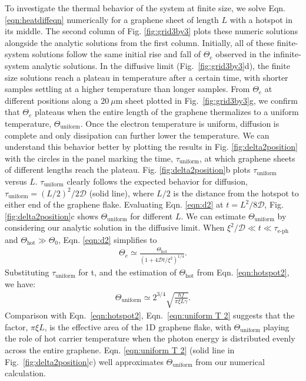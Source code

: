 \documentclass[aip, amsmath,amssymb, reprint]{revtex4-1}
\newcommand{\ba}{\begin{eqnarray}}
\newcommand{\ea}{\end{eqnarray}}
\begin{document}
To investigate the thermal behavior of the system at finite size, we solve Eqn. \ref{eqn:heatdiffeqn} numerically for a graphene sheet of length $L$ with a hotspot in its middle. The second column of Fig. \ref{fig:grid3by3} plots these numeric solutions alongside the analytic solutions from the first column. Initially, all of these finite-system solutions follow the same initial rise and fall of $\Theta_e$ observed in the infinite-system analytic solutions. In the diffusive limit (Fig.~\ref{fig:grid3by3}d), the finite size solutions reach a plateau in temperature after a certain time, with shorter samples settling at a higher temperature than longer samples. From $\Theta_e$ at different positions along a $20~\mu$m sheet plotted in Fig.~\ref{fig:grid3by3}g, we confirm that $\Theta_e$ plateaus when the entire length of the graphene thermalizes to a uniform temperature, $\Theta_{\text{uniform}}$. Once the electron temperature is uniform, diffusion is complete and only dissipation can further lower the temperature. We can understand this behavior better by plotting the results in Fig. \ref{fig:delta2position} with the circles in the panel marking the time, $\tau_{\text{uniform}}$, at which graphene sheets of different lengths reach the plateau. Fig. \ref{fig:delta2position}b plots $\tau_{\text{uniform}}$ versus $L$. $\tau_{\text{uniform}}$ clearly follows the expected behavior for diffusion, $\tau_{\text{uniform}} = (L/2)^2/2\mathcal{D}$ (solid line), where $L/2$ is the distance from the hotspot to either end of the graphene flake. Evaluating Eqn. \ref{eqn:d2} at $t = L^2/8\mathcal{D}$, Fig. \ref{fig:delta2position}c shows $\Theta_{\text{uniform}}$ for different $L$. We can estimate $\Theta_{\text{uniform}}$ by considering our analytic solution in the diffusive limit. When $\xi^{2}/\mathcal{D} \ll t \ll \tau_{\text{e-ph}}$ and $\Theta_{\text{hot}} \gg \Theta_0$, Eqn. \ref{eqn:d2} simplifies to \ba \Theta_e	\simeq \frac{\Theta_{\text{hot}}}{\left(1+4\mathcal{D}t/\xi^{2} \right)^{1/4}}.\label{eqn:uniform T} \ea Substituting $\tau_{\text{uniform}}$ for t, and the estimation of $\Theta_{\text{hot}}$ from Eqn. \ref{eqn:hotspot2}, we have:  \ba \Theta_{\text{uniform}} \simeq 2^{3/4}\sqrt{\frac{hf}{\pi\xi L \gamma}}. \label{eqn:uniform T 2} \ea Comparison with Eqn.~\ref{eqn:hotspot2}, Eqn.~\ref{eqn:uniform T 2} suggests that the factor, $\pi\xi L$, is the effective area of the 1D graphene flake, with $\Theta_{\text{uniform}}$ playing the role of hot carrier temperature when the photon energy is distributed evenly across the entire graphene. Eqn. \ref{eqn:uniform T 2} (solid line in Fig.~\ref{fig:delta2position}c) well approximates $\Theta_{\text{uniform}}$ from our numerical calculation.
\end{document}
